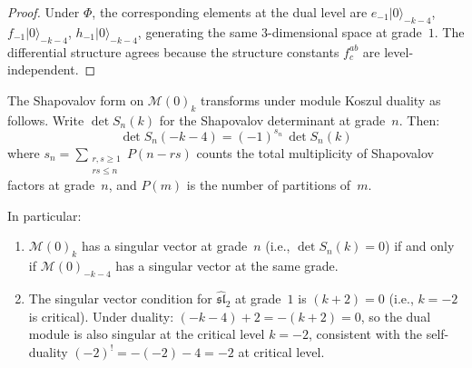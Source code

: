 \begin{proof}
Under $\Phi$, the corresponding elements at the dual level
are $e_{-1}|0\rangle_{-k-4}$, $f_{-1}|0\rangle_{-k-4}$,
$h_{-1}|0\rangle_{-k-4}$, generating the same $3$-dimensional
space at grade~$1$.  The differential structure agrees because the
structure constants $f^{ab}_c$ are level-independent.
\end{proof}

\begin{proposition}
\label{prop:shapovalov-koszul}
The Shapovalov form on $\mathcal{M}(0)_k$ transforms under
module Koszul duality as follows.  Write
$\det S_n(k)$ for the Shapovalov determinant at grade~$n$.
Then:
\begin{equation}\label{eq:shapovalov-transform}
\det S_n(-k-4) = (-1)^{s_n}\, \det S_n(k)
\end{equation}
where $s_n = \sum_{\substack{r,s \geq 1 \\ rs \leq n}} P(n - rs)$
counts the total multiplicity of Shapovalov factors at grade~$n$,
and $P(m)$ is the number of partitions of~$m$.

In particular:
\begin{enumerate}[label=\textup{(\roman*)}]
\item $\mathcal{M}(0)_k$ has a singular vector at grade~$n$
  \textup{(}i.e., $\det S_n(k) = 0$\textup{)} if and only if
  $\mathcal{M}(0)_{-k-4}$ has a singular vector at the same grade.
\item The singular vector condition for
  $\widehat{\mathfrak{sl}}_2$ at grade~$1$ is
  $(k+2) = 0$ \textup{(}i.e., $k = -2$ is critical\textup{)}.
  Under duality: $(-k-4) + 2 = -(k+2) = 0$, so the dual module
  is also singular at the critical level $k = -2$, consistent
  with the self-duality $(-2)^! = -(-2)-4 = -2$ at critical
  level.
\end{enumerate}
\end{proposition}

